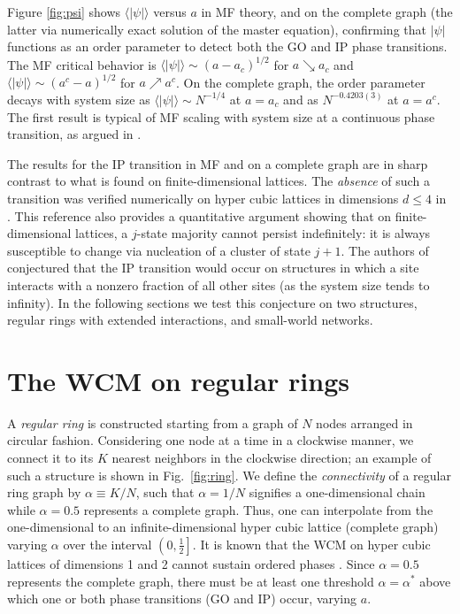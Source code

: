 Figure \ref{fig:psi} shows $\langle |\psi| \rangle$ versus $a$ in MF theory, and on the complete graph (the latter via numerically
exact solution of the master equation), confirming that $|\psi|$ functions as an order parameter to detect both the GO and IP phase
transitions. The MF critical behavior is $\langle |\psi| \rangle \sim (a- a_c)^{1/2} $ for $a \searrow a_c$ and $\langle |\psi| \rangle
\sim (a^c - a)^{1/2}$ for $a \nearrow a^c$.  On the complete graph, the order parameter decays with system size as $\langle |\psi|
\rangle \sim N^{-1/4}$ at $a=a_c$ and as $N^{-0.4203(3)}$ at $a=a^c$. The first result is typical of MF scaling with system size at a
continuous phase transition, as argued in \cite{assis2011infinite}.

The results for the IP transition in MF and on a complete graph are in sharp contrast to what is found on finite-dimensional lattices.
The \textit{absence} of such a transition was verified numerically on hyper cubic lattices in dimensions $d \leq 4$ in
\cite{assis2011infinite}. This reference also provides a quantitative argument showing that on finite-dimensional lattices, a $j$-state
majority cannot persist indefinitely: it is always susceptible to change via nucleation of a cluster of state $j+1$. The authors of
\cite{assis2011infinite} conjectured that the IP transition would occur on structures in which a site interacts with a nonzero fraction
of all other sites (as the system size tends to infinity). In the following sections we test this conjecture on two structures, regular
rings with extended interactions, and small-world networks.

\section{\label{regularrings} The WCM on regular rings }


A \textit{regular ring} is constructed starting from a graph of $N$ nodes arranged in circular fashion. Considering one node at a time in
a clockwise manner, we connect it to its $K$ nearest neighbors in the clockwise direction; an example of such a structure is shown in
Fig.~\ref{fig:ring}. We define the \textit{connectivity} of a regular ring graph by $\alpha \equiv K/N$, such that $\alpha=1/N$ signifies
a one-dimensional chain while $\alpha=0.5$ represents a complete graph. Thus, one can interpolate from the one-dimensional to an
infinite-dimensional hyper cubic lattice (complete graph) varying $\alpha$ over the interval $\left( 0, \frac{1}{2} \right]$.  It is
known that the WCM on hyper cubic lattices of dimensions 1 and 2 cannot sustain ordered phases \cite{Wood06a, assis2011infinite}. Since
$\alpha=0.5$ represents the complete graph, there must be at least one threshold $\alpha=\alpha^*$ above which one or both phase
transitions (GO and IP) occur, varying $a$.

